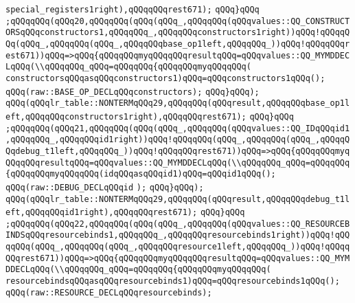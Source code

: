 \verb|special_registers1right),qQQqqQQqrest671);|\newline
\verb|qQQq}qQQq|\newline
\verb|;qQQqqQQq(qQQq20,qQQqqQQq(qQQq(qQQq_,qQQqqQQq(qQQqvalues::QQ_CONSTRUCTORSqQQqconstructors1,qQQqqQQq_,qQQqqQQqconstructors1right))qQQq!qQQqqQQq(qQQq_,qQQqqQQq(qQQq_,qQQqqQQqbase_op1left,qQQqqQQq_))qQQq!qQQqqQQqrest671))qQQq=>qQQq{qQQqqQQqmyqQQqqQQqresultqQQq=qQQqvalues::QQ_MYMDDECLqQQq(\\qQQqqQQq_qQQq=qQQqqQQq{qQQqqQQqmyqQQqqQQq(|\newline
\verb|constructorsqQQqasqQQqconstructors1)qQQq=qQQqconstructors1qQQq();|\newline
\verb|qQQq(raw::BASE_OP_DECLqQQqconstructors);|\newline
\verb|qQQq}qQQq);|\newline
\verb|qQQq(qQQqlr_table::NONTERMqQQq29,qQQqqQQq(qQQqresult,qQQqqQQqbase_op1left,qQQqqQQqconstructors1right),qQQqqQQqrest671);|\newline
\verb|qQQq}qQQq|\newline
\verb|;qQQqqQQq(qQQq21,qQQqqQQq(qQQq(qQQq_,qQQqqQQq(qQQqvalues::QQ_IDqQQqid1,qQQqqQQq_,qQQqqQQqid1right))qQQq!qQQqqQQq(qQQq_,qQQqqQQq(qQQq_,qQQqqQQqdebug_t1left,qQQqqQQq_))qQQq!qQQqqQQqrest671))qQQq=>qQQq{qQQqqQQqmyqQQqqQQqresultqQQq=qQQqvalues::QQ_MYMDDECLqQQq(\\qQQqqQQq_qQQq=qQQqqQQq{qQQqqQQqmyqQQqqQQq(idqQQqasqQQqid1)qQQq=qQQqid1qQQq();|\newline
\verb|qQQq(raw::DEBUG_DECLqQQqid|\newline
\verb|);|\newline
\verb|qQQq}qQQq);|\newline
\verb|qQQq(qQQqlr_table::NONTERMqQQq29,qQQqqQQq(qQQqresult,qQQqqQQqdebug_t1left,qQQqqQQqid1right),qQQqqQQqrest671);|\newline
\verb|qQQq}qQQq|\newline
\verb|;qQQqqQQq(qQQq22,qQQqqQQq(qQQq(qQQq_,qQQqqQQq(qQQqvalues::QQ_RESOURCEBINDSqQQqresourcebinds1,qQQqqQQq_,qQQqqQQqresourcebinds1right))qQQq!qQQqqQQq(qQQq_,qQQqqQQq(qQQq_,qQQqqQQqresource1left,qQQqqQQq_))qQQq!qQQqqQQqrest671))qQQq=>qQQq{qQQqqQQqmyqQQqqQQqresultqQQq=qQQqvalues::QQ_MYMDDECLqQQq(\\qQQqqQQq_qQQq=qQQqqQQq{qQQqqQQqmyqQQqqQQq(|\newline
\verb|resourcebindsqQQqasqQQqresourcebinds1)qQQq=qQQqresourcebinds1qQQq();|\newline
\verb|qQQq(raw::RESOURCE_DECLqQQqresourcebinds);|\newline
